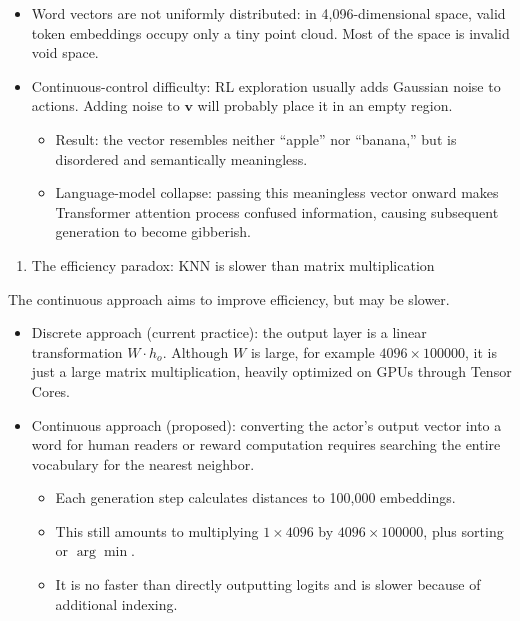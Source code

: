 \begin{itemize}
\tightlist
\item
  Word vectors are not uniformly distributed: in 4,096-dimensional space, valid token embeddings occupy only a tiny point cloud. Most of the space is invalid void space.
\item
  Continuous-control difficulty: RL exploration usually adds Gaussian noise to actions. Adding noise to \(\mathbf{v}\) will probably place it in an empty region.

  \begin{itemize}
  \tightlist
  \item
    Result: the vector resembles neither ``apple'' nor ``banana,'' but is disordered and semantically meaningless.
  \item
    Language-model collapse: passing this meaningless vector onward makes Transformer attention process confused information, causing subsequent generation to become gibberish.
  \end{itemize}
\end{itemize}

\begin{enumerate}
\def\labelenumi{\arabic{enumi}.}
\setcounter{enumi}{2}
\tightlist
\item
  The efficiency paradox: KNN is slower than matrix multiplication
\end{enumerate}

The continuous approach aims to improve efficiency, but may be slower.

\begin{itemize}
\tightlist
\item
  Discrete approach (current practice): the output layer is a linear transformation \(W\cdot h_o\). Although \(W\) is large, for example \(4096\times100000\), it is just a large matrix multiplication, heavily optimized on GPUs through Tensor Cores.
\item
  Continuous approach (proposed): converting the actor's output vector into a word for human readers or reward computation requires searching the entire vocabulary for the nearest neighbor.

  \begin{itemize}
  \tightlist
  \item
    Each generation step calculates distances to 100,000 embeddings.
  \item
    This still amounts to multiplying \(1\times4096\) by \(4096\times100000\), plus sorting or \(\arg\min\).
  \item
    It is no faster than directly outputting logits and is slower because of additional indexing.
  \end{itemize}
\end{itemize}


